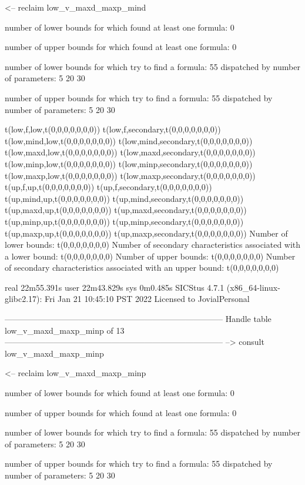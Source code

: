 <-- reclaim low_v_maxd_maxp_mind

number of lower bounds for which found at least one formula: 0

number of upper bounds for which found at least one formula: 0

number of lower bounds for which try to find a formula: 55
dispatched by number of parameters: 5  20  30

number of upper bounds for which try to find a formula: 55
dispatched by number of parameters: 5  20  30

t(low,f,low,t(0,0,0,0,0,0,0))
t(low,f,secondary,t(0,0,0,0,0,0,0))
t(low,mind,low,t(0,0,0,0,0,0,0))
t(low,mind,secondary,t(0,0,0,0,0,0,0))
t(low,maxd,low,t(0,0,0,0,0,0,0))
t(low,maxd,secondary,t(0,0,0,0,0,0,0))
t(low,minp,low,t(0,0,0,0,0,0,0))
t(low,minp,secondary,t(0,0,0,0,0,0,0))
t(low,maxp,low,t(0,0,0,0,0,0,0))
t(low,maxp,secondary,t(0,0,0,0,0,0,0))
t(up,f,up,t(0,0,0,0,0,0,0))
t(up,f,secondary,t(0,0,0,0,0,0,0))
t(up,mind,up,t(0,0,0,0,0,0,0))
t(up,mind,secondary,t(0,0,0,0,0,0,0))
t(up,maxd,up,t(0,0,0,0,0,0,0))
t(up,maxd,secondary,t(0,0,0,0,0,0,0))
t(up,minp,up,t(0,0,0,0,0,0,0))
t(up,minp,secondary,t(0,0,0,0,0,0,0))
t(up,maxp,up,t(0,0,0,0,0,0,0))
t(up,maxp,secondary,t(0,0,0,0,0,0,0))
Number of lower bounds:                                             t(0,0,0,0,0,0,0)
Number of secondary characteristics associated with a lower bound:  t(0,0,0,0,0,0,0)
Number of upper bounds:                                             t(0,0,0,0,0,0,0)
Number of secondary characteristics associated with an upper bound: t(0,0,0,0,0,0,0)

real	22m55.391s
user	22m43.829s
sys	0m0.485s
SICStus 4.7.1 (x86_64-linux-glibc2.17): Fri Jan 21 10:45:10 PST 2022
Licensed to JovialPersonal


--------------------------------------------------------------------------------
Handle table low_v_maxd_maxp_minp of 13
--------------------------------------------------------------------------------
--> consult low_v_maxd_maxp_minp

<-- reclaim low_v_maxd_maxp_minp

number of lower bounds for which found at least one formula: 0

number of upper bounds for which found at least one formula: 0

number of lower bounds for which try to find a formula: 55
dispatched by number of parameters: 5  20  30

number of upper bounds for which try to find a formula: 55
dispatched by number of parameters: 5  20  30

